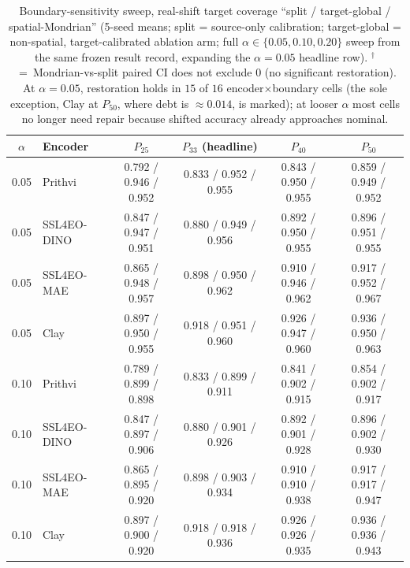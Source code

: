 \documentclass[journal]{IEEEtran}
\renewcommand{\_}{\textunderscore\allowbreak}
\begin{document}
\begin{table}[!t]\centering\small
\caption{Boundary-sensitivity sweep, real-shift target coverage ``split / target-global /
spatial-Mondrian'' (5-seed means; split = source-only calibration; target-global = non-spatial,
target-calibrated ablation arm; full $\alpha\in\{0.05,0.10,0.20\}$ sweep from the same frozen result
record, expanding the $\alpha{=}0.05$ headline row). $^{\dagger}$~=~Mondrian-vs-split paired CI does not
exclude $0$ (no significant restoration). At $\alpha{=}0.05$, restoration holds in $15$ of $16$
encoder$\times$boundary cells (the sole exception, Clay at $P_{50}$, where debt is ${\approx}0.014$, is
marked); at looser $\alpha$ most cells no longer need repair because shifted accuracy already approaches
nominal.}\label{tab:boundary}
\begin{tabular}{clcccc}
\toprule
$\alpha$ & Encoder & $P_{25}$ & $P_{33}$ (headline) & $P_{40}$ & $P_{50}$ \\
\midrule
0.05 & Prithvi & 0.792 / 0.946 / 0.952 & 0.833 / 0.952 / 0.955 & 0.843 / 0.950 / 0.955 & 0.859 / 0.949 / 0.952 \\
0.05 & SSL4EO-DINO & 0.847 / 0.947 / 0.951 & 0.880 / 0.949 / 0.956 & 0.892 / 0.950 / 0.955 & 0.896 / 0.951 / 0.955 \\
0.05 & SSL4EO-MAE & 0.865 / 0.948 / 0.957 & 0.898 / 0.950 / 0.962 & 0.910 / 0.946 / 0.962 & 0.917 / 0.952 / 0.967 \\
0.05 & Clay & 0.897 / 0.950 / 0.955 & 0.918 / 0.951 / 0.960 & 0.926 / 0.947 / 0.960 & 0.936 / 0.950 / 0.963\rlap{$^{\dagger}$} \\
\midrule
0.10 & Prithvi & 0.789 / 0.899 / 0.898 & 0.833 / 0.899 / 0.911 & 0.841 / 0.902 / 0.915 & 0.854 / 0.902 / 0.917 \\
0.10 & SSL4EO-DINO & 0.847 / 0.897 / 0.906 & 0.880 / 0.901 / 0.926\rlap{$^{\dagger}$} & 0.892 / 0.901 / 0.928\rlap{$^{\dagger}$} & 0.896 / 0.902 / 0.930\rlap{$^{\dagger}$} \\
0.10 & SSL4EO-MAE & 0.865 / 0.895 / 0.920\rlap{$^{\dagger}$} & 0.898 / 0.903 / 0.934\rlap{$^{\dagger}$} & 0.910 / 0.910 / 0.938\rlap{$^{\dagger}$} & 0.917 / 0.917 / 0.947\rlap{$^{\dagger}$} \\
0.10 & Clay & 0.897 / 0.900 / 0.920\rlap{$^{\dagger}$} & 0.918 / 0.918 / 0.936\rlap{$^{\dagger}$} & 0.926 / 0.926 / 0.935\rlap{$^{\dagger}$} & 0.936 / 0.936 / 0.943\rlap{$^{\dagger}$} \\

\end{tabular}
\end{table}
\end{document}
